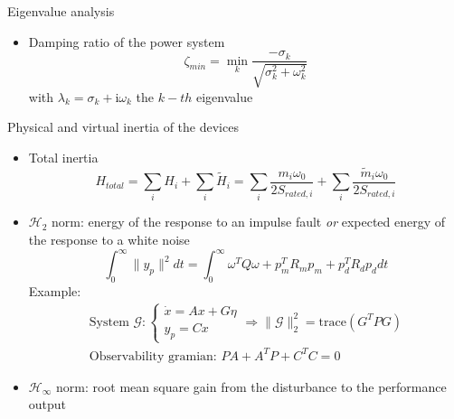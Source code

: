 \documentclass[aspectratio=169, 12pt]{beamer}
\begin{document}
  \begin{frame}
    Eigenvalue analysis
    \begin{itemize}
      \item Damping ratio of the power system
      \begin{equation}
        \zeta_{min} = \min_{k}\frac{-\sigma_k}{\sqrt{\sigma_k^2 + \omega_k^2}}
      \end{equation}
      with $\lambda_k=\sigma_k + \text{i}\omega_k$ the $k-th$ eigenvalue
    \end{itemize}
    
    Physical and virtual inertia of the devices
  \begin{itemize}
    \item Total inertia
    \begin{equation}
      H_{total} = \sum_{i}H_i + \sum_{i} \tilde{H}_i = \sum_{i}\frac{m_i \omega_0}{2 S_{rated,i}} + \sum_{i} \frac{\tilde{m}_i \omega_0}{2 S_{rated,i}}
    \end{equation} 
  \end{itemize}
\end{frame}

\begin{frame}
  \begin{itemize}[<+(1)->]
    \item $\mathcal{H}_2$ norm: energy of the response to an impulse fault \textit{or} expected energy of the response to a white noise
    \begin{equation}
      \int_{0}^{\infty}\| y_p \|^2 dt = \int_{0}^{\infty} \omega^T Q \omega + p_{m}^T R_m p_{m} + p_{d}^T R_d p_{d} dt
    \end{equation}
    \textcolor{NTNUViolet}{
    Example: 
    \begin{gather}
      \text{System } \mathcal{G} :
      \begin{cases}
        \dot{x} = A x + G \eta \\
        y_p = C x
      \end{cases}
      \Rightarrow \| \mathcal{G} \|_2^2=\text{trace}\left(G^T P G\right)\\
      \text{Observability gramian: } PA + A^TP+C^TC=0
    \end{gather} 
    }
    \item $\mathcal{H}_{\infty }$ norm: root mean square gain from the disturbance to the performance output
  \end{itemize}
\end{frame}
\end{document}
